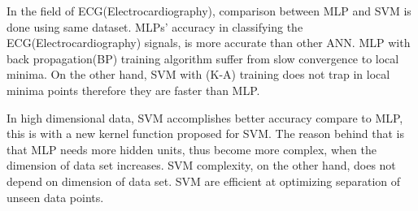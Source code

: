 


In the field of ECG(Electrocardiography), comparison between MLP and SVM is done using same dataset. MLPs' accuracy in classifying the ECG(Electrocardiography) signals, is more accurate than other ANN. MLP with back propagation(BP) training algorithm suffer from slow convergence to local minima. On the other hand, SVM with (K-A) training does not trap in local minima points therefore they are faster than MLP\cite{Moavenian20103088}.

In high dimensional data, SVM accomplishes better accuracy compare to MLP, this is with a new kernel function proposed for SVM. The reason behind that is that MLP needs more hidden units, thus become more complex, when the dimension of data set increases. SVM complexity, on the other hand, does not depend on dimension of data set. SVM are efficient at optimizing separation of unseen data points\cite{Zanaty2012177}.

